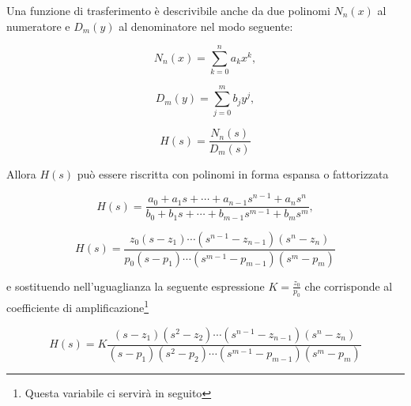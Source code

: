 \documentclass[a4paper, 10pt, final]{article} %
\begin{document}
    \noindent Una funzione di trasferimento \`{e} descrivibile anche da due polinomi $N_n(x)$ al numeratore e $D_m(y)$ al denominatore nel modo seguente:
    \begin{figure}[H]
        \centering
        \begin{minipage}[b]{.3\linewidth}
            \centering
            \[
                N_n(x) = \sum^{n}_{k=0} a_k x^k \mathrm{,}
            \]
        \end{minipage}
        \begin{minipage}[b]{.3\linewidth}
            \centering
            \[
                D_m(y) = \sum^{m}_{j=0} b_j y^j \mathrm{,}
            \]
        \end{minipage}
        \begin{minipage}[b]{.3\linewidth}
            \centering
            \[
                H(s) = \frac{N_n(s)}{D_m(s)}
            \]
        \end{minipage}
    \end{figure}
    \noindent Allora $H(s)$ pu\`{o} essere riscritta con polinomi in forma espansa o fattorizzata
    \begin{figure}[H]
        \centering
        \begin{minipage}[b]{.45\linewidth}
            \centering
            \[
                H(s) = \frac{a_0 + a_1 s + \dotsm + a_{n-1} s^{n-1} + a_n s^n}{b_0 + b_1 s + \dotsm + b_{m-1} s^{m-1} + b_m s^m} \mathrm{,}
            \]
        \end{minipage}
        \hspace{0.04\linewidth}
        \begin{minipage}[b]{.45\linewidth}
            \centering
            \[
                H(s) = \frac{z_0 \left(s - z_1\right) \dotsm \left(s^{n-1} - z_{n-1}\right) \left(s^n - z_n\right)}{p_0 \left(s - p_1\right) \dotsm \left(s^{m-1} - p_{m-1}\right) \left(s^m - p_m\right)}
            \]
        \end{minipage}
    \end{figure}
    \noindent e sostituendo nell'uguaglianza la seguente espressione $K = \frac{z_0}{p_0}$ che corrisponde al coefficiente di amplificazione\footnote{Questa variabile ci servir\`{a} in seguito} 
    \begin{figure}[H]
        \centering
        \[
            H(s) = K \frac{\left(s - z_1\right) \left(s^2 - z_2\right) \dotsm \left(s^{n-1} - z_{n-1}\right) \left(s^n - z_n\right)}{\left(s - p_1\right) \left(s^2 - p_2\right) \dotsm \left(s^{m-1} - p_{m-1}\right) \left(s^m - p_m\right)}
        \]
    \end{figure}
\end{document}
